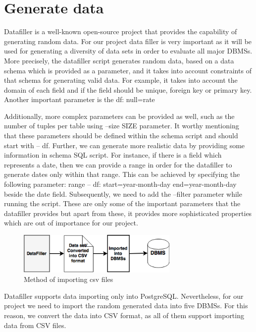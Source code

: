 \section{Generate data}
Datafiller is a well-known open-source project that provides the capability of generating random data. For our project data filler is very important as it will be used for generating a diversity of  data sets in order to evaluate all major DBMSs. More precisely, the datafiller script generates random data, based on a data schema which is provided as a parameter, and it takes into account constraints of that schema for generating valid data. For example, it takes into account the domain of each field and if the field should be unique, foreign key or primary key. Another important parameter is the df: null=rate%

Additionally, more complex parameters can be provided as well, such as the number of tuples per table using --size SIZE parameter. It worthy mentioning that these parameters should be defined within the schema script and should start with -- df.  Further, we can generate more realistic data by providing some information in schema SQL script. For instance, if there is a field which represents a date, then we can provide a range in order for the datafiller to generate dates only within that range. This can be achieved by specifying the following parameter: range -- df: start=year-month-day end=year-month-day beside the date field. Subsequently, we need to add the --filter parameter while running the script. These are only some of the important parameters that the datafiller provides but apart from these, it provides more sophisticated properties which are out of importance for our project.


 \begin{figure} 
      \centering
      \includegraphics[width=\textwidth,height=2cm]{Images/4-Datafiller}
      \caption{Method of importing csv files}
      \label{fig:counting-methods}
  \end{figure}  


Datafiller supports data importing only into PostgreSQL. Nevertheless, for our project we need to import the random generated data into five DBMSs. For this reason, we convert the data into CSV format, as all of them support importing data from CSV files.  

